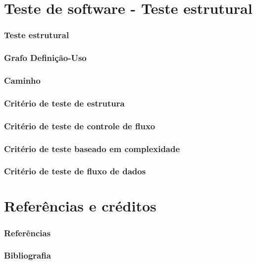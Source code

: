 \documentclass[utf8, usepdftitle=false, svgnames, color={table,
fixpdftex, hyperref, fixinclude, xcdraw}, t, brazil]{beamer}
\begin{document}
 \part{Teste de software - Teste estrutural}
 
 \section{Teste estrutural}
 
 
 \section{Grafo Definição-Uso}
 

 \section{Caminho}
 

 \section{Critério de teste de estrutura}
 
 
 \section{Critério de teste de controle de fluxo}
  
 
 \section{Critério de teste baseado em complexidade}
  

 \section{Critério de teste de fluxo de dados}
   
 
 \part{Referências e créditos}
 
 \section{Referências}
 
 
 \section{Bibliografia}
 
 
%  
\end{document}
